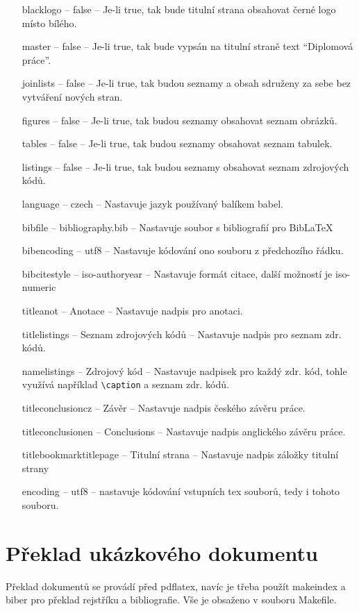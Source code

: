 \documentclass[a4paper,12pt]{article}
\begin{document}
\begin{itemize}
\item[blacklogo] -- false -- Je-li true, tak bude titulní strana obsahovat černé logo místo bílého. 
\item[master] -- false -- Je-li true, tak bude vypsán na titulní straně text \enquote{Diplomová práce}. 
\item[joinlists] -- false -- Je-li true, tak budou seznamy a obsah sdruženy za sebe bez vytváření nových stran. 
\item[figures] -- false -- Je-li true, tak budou seznamy obsahovat seznam obrázků. 
\item[tables] -- false -- Je-li true, tak budou seznamy obsahovat seznam tabulek.  
\item[listings] -- false -- Je-li true, tak budou seznamy obsahovat seznam zdrojových kódů.  
\item[language] -- czech -- Nastavuje jazyk používaný balíkem babel. 
\item[bibfile] -- bibliography.bib -- Nastavuje soubor s bibliografií pro Bib\LaTeX 
\item[bibencoding] -- utf8 -- Nastavuje kódování ono souboru z předchozího řádku. 
\item[bibcitestyle] -- iso-authoryear -- Nastavuje formát citace, další možností je iso-numeric 
\item[titleanot] -- Anotace -- Nastavuje nadpis pro anotaci. 
\item[titlelistings] -- Seznam zdrojových kódů -- Nastavuje nadpis pro seznam zdr. kódů. 
\item[namelistings] -- Zdrojový kód -- Nastavuje nadpisek pro každý zdr. kód, tohle využívá například \verb|\caption| a seznam zdr. kódů. 
\item[titleconclusioncz] -- Závěr -- Nastavuje nadpis českého závěru práce. 
\item[titleconclusionen] -- Conclusions -- Nastavuje nadpis anglického závěru práce. 
\item[titlebookmarktitlepage] -- Titulní strana -- Nastavuje nadpis záložky titulní strany 
\item[encoding] -- utf8 -- nastavuje kódování vstupních tex souborů, tedy i tohoto souboru. 
\end{itemize}

\section{Překlad ukázkového dokumentu}
Překlad dokumentů se provádí před pdflatex, navíc je třeba použít makeindex a biber pro překlad rejstříku a bibliografie. Vše je obsaženo v souboru Makefile.
\end{document}
